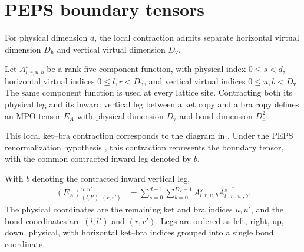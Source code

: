 \section{PEPS boundary tensors}

For physical dimension $d$, the local contraction admits separate horizontal
virtual dimension $D_{\mathrm h}$ and vertical virtual dimension
$D_{\mathrm v}$.

\begin{definition}
    \label{def:peps_local_boundary_tensor}
    \leanok
    Let $A^s_{l,r,u,b}$ be a rank-five component function, with physical index
    $0\leq s<d$, horizontal virtual indices
    $0\leq l,r<D_{\mathrm h}$, and vertical virtual indices
    $0\leq u,b<D_{\mathrm v}$. The same component function is used at every
    lattice site. Contracting both its physical leg and its inward vertical leg
    between a ket copy and a bra copy defines an MPO tensor $E_A$ with physical
    dimension $D_{\mathrm v}$ and bond dimension $D_{\mathrm h}^2$.

    This local ket--bra contraction corresponds to the diagram in
    \cite[lines~721--724]{Cirac2016MPDO_arXiv}. Under the PEPS renormalization
    hypothesis \cite[lines~716--724]{Cirac2016MPDO_arXiv}, this contraction
    represents the boundary tensor, with the common contracted inward leg denoted
    by $b$.
\end{definition}

\begin{lemma}
    \label{thm:peps_local_boundary_tensor_formula}
    \leanok
    With $b$ denoting the contracted inward vertical leg,
    \begin{align}
        (E_A)^{u,u'}_{(l,l'),(r,r')}
         & =\sum_{s=0}^{d-1}\sum_{b=0}^{D_{\mathrm v}-1}
        A^s_{l,r,u,b}
        \overline{A^s_{l',r',u',b}}.
        \label{eq:peps_local_boundary_tensor_component}
    \end{align}
    The physical coordinates are the remaining ket and bra indices $u,u'$, and
    the bond coordinates are $(l,l')$ and $(r,r')$. Legs are ordered as
    left, right, up, down, physical, with horizontal ket--bra indices grouped
    into a single bond coordinate.
\end{lemma}

